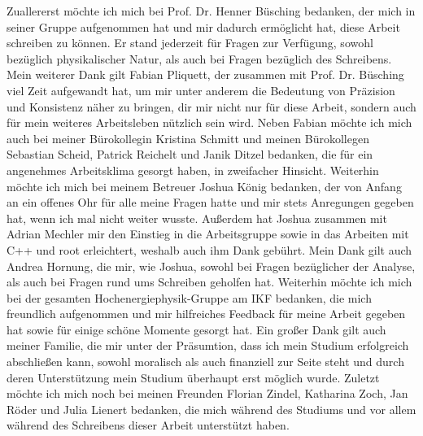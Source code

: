 Zuallererst möchte ich mich bei Prof. Dr. Henner Büsching bedanken, der mich in seiner Gruppe aufgenommen hat und mir dadurch ermöglicht hat, diese Arbeit schreiben zu können.
Er stand jederzeit für Fragen zur Verfügung, sowohl bezüglich physikalischer Natur, als auch bei Fragen bezüglich des Schreibens.
\newline
Mein weiterer Dank gilt Fabian Pliquett, der zusammen mit Prof. Dr. Büsching viel Zeit aufgewandt hat, um mir unter anderem die Bedeutung von Präzision und Konsistenz näher zu bringen, dir mir nicht nur für diese Arbeit, sondern auch für mein weiteres Arbeitsleben nützlich sein wird.
\newline
Neben Fabian möchte ich mich auch bei meiner Bürokollegin Kristina Schmitt und meinen Büro\-kol\-le\-gen Sebastian Scheid, Patrick Reichelt und Janik Ditzel bedanken, die für ein angenehmes Arbeitsklima gesorgt haben, in zweifacher Hinsicht.
\newline
Weiterhin möchte ich mich bei meinem Betreuer Joshua König bedanken, der von Anfang an ein offenes Ohr für alle meine Fragen hatte und mir stets Anregungen gegeben hat, wenn ich mal nicht weiter wusste.
\newline
Außerdem hat Joshua zusammen mit Adrian Mechler mir den Einstieg in die Arbeitsgruppe sowie in das Arbeiten mit C++ und root erleichtert, weshalb auch ihm Dank gebührt.
\newline
Mein Dank gilt auch Andrea Hornung, die mir, wie Joshua, sowohl bei Fragen bezüglicher der Analyse, als auch bei Fragen rund ums Schreiben geholfen hat.
\newline
Weiterhin möchte ich mich bei der gesamten Hochenergiephysik-Gruppe am IKF bedanken, die mich freundlich aufgenommen und mir hilfreiches Feedback für meine Arbeit gegeben hat sowie für einige schöne Momente gesorgt hat.
\newline 
Ein großer Dank gilt auch meiner Familie, die mir unter der Präsumtion, dass ich mein Studium erfolgreich abschließen kann, sowohl moralisch als auch finanziell zur Seite steht und durch deren Unterstützung mein Studium überhaupt erst möglich wurde.
\newline
Zuletzt möchte ich mich noch bei meinen Freunden Florian Zindel, Katharina Zoch, Jan Röder und Julia Lienert bedanken, die mich während des Studiums und vor allem während des Schreibens dieser Arbeit unterstützt haben.